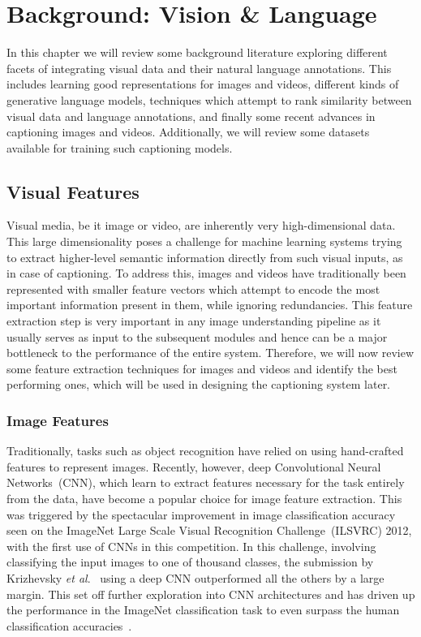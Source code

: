 \chapter{Background: Vision \& Language} \label{chapter:background} 
In this chapter we will review some background literature exploring different
facets of integrating visual data and their natural language annotations.
This includes learning good representations for images and videos, different
kinds of generative language models, techniques which attempt to rank similarity
between visual data and language annotations, and finally some recent advances
in captioning images and videos.
Additionally, we will review some datasets available for training such captioning
models.

\section{Visual Features}
Visual media, be it image or video, are inherently very high-dimensional data.
This large dimensionality poses a challenge for machine learning systems trying
to extract higher-level semantic information directly from such visual inputs,
as in case of captioning.
To address this, images and videos have traditionally been represented with
smaller feature vectors which attempt to encode the most important information
present in them, while ignoring redundancies. 
This feature extraction step is very important in any image understanding
pipeline as it usually serves as input to the subsequent modules and hence can
be a major bottleneck to the performance of the entire system.
Therefore, we will now review some feature extraction techniques for images and
videos and identify the best performing ones, which will be used in designing
the captioning system later.

\subsection{Image Features}
Traditionally, tasks such as object recognition have relied on using
hand-crafted features to represent images. 
Recently, however, deep Convolutional Neural Networks~(CNN), which learn to
extract features necessary for the task entirely from the data, have become a
popular choice for image feature extraction.
This was triggered by the spectacular improvement in image classification
accuracy seen on the ImageNet Large Scale Visual Recognition Challenge~(ILSVRC)
2012, with the first use of CNNs in this competition.
In this challenge, involving classifying the input images to one of thousand
classes, the submission by Krizhevsky \emph{et al}.\@~\cite{Krizhevsky2012}
using a deep CNN outperformed all the others by a large margin.
This set off further exploration into CNN architectures and has driven up the
performance in the ImageNet classification task to even surpass the human
classification accuracies~\cite{he2015delving}.

